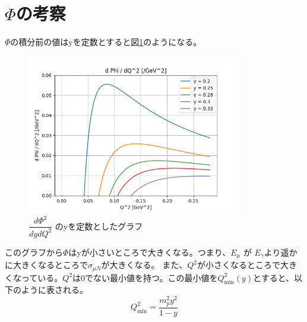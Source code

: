\section{\texorpdfstring{$\Phi$}{LG}の考察}\label{section2_3}
$\Phi$の積分前の値はyを定数とすると図\ref{fig:sigma3}のようになる。
\begin{figure}[H]
    \centering
    \includegraphics[height=7cm]{img/flux_fixed_y.png}
    \caption{$\dfrac{d\Phi ^2}{dydQ^2}$ のyを定数としたグラフ}
    \label{fig:sigma3}
\end{figure}
このグラフから$\Phi$はyが小さいところで大きくなる。つまり、$E_\mu$ が $E_\gamma$より遥かに大きくなるところで$\sigma_{\mu N}$が大きくなる。
また、$Q^2$が小さくなるところで大きくなっている。$Q^2$は0でない最小値を持つ。この最小値を$Q^2_{\mathrm{min}}(y)$とすると、以下のように表される。
\begin{equation}
    \label{eq2_8}
    Q^2_{\mathrm{min}} = \dfrac{m_p^2 y^2}{1-y}
\end{equation}

